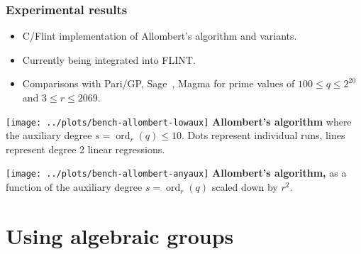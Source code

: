 \documentclass[francais]{beamer}
\DeclareMathOperator{\ord}{ord}
\begin{document}
\begin{frame}\frametitle{Experimental results}
  \begin{itemize}
  \item C/Flint implementation of Allombert's algorithm and variants.
  \item Currently being integrated into FLINT.
  \item Comparisons with Pari/GP, Sage~\cite{Sage}, Magma for prime values of $100\le q\le 2^{20}$ and $3\le r\le 2069$.
  \end{itemize}
\end{frame}

\begin{frame}
    \centering
    \texttt{[image: ../plots/bench-allombert-lowaux]}
      \flushleft
      \textbf{Allombert's algorithm} where the auxiliary degree
      $s=\ord_r(q)\le 10$.  Dots represent individual runs, lines
      represent degree 2 linear regressions.
\end{frame}

\begin{frame}
    \centering
    \texttt{[image: ../plots/bench-allombert-anyaux]}
      \flushleft
      \textbf{Allombert's algorithm,} as a function of the auxiliary degree
      $s=\ord_r(q)$ scaled down by $r^2$.
\end{frame}

\section{Using algebraic groups}
\end{document}
